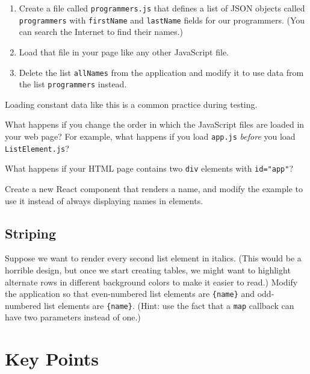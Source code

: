 
\begin{enumerate}
\item
  Create a file called \texttt{programmers.js} that defines
  a list of JSON objects called \texttt{programmers}
  with \texttt{firstName} and \texttt{lastName} fields for our programmers.
  (You can search the Internet to find their names.)
\item
  Load that file in your page like any other JavaScript file.
\item
  Delete the list \texttt{allNames} from the application
  and modify it to use data from the list \texttt{programmers} instead.
\end{enumerate}

Loading constant data like this is a common practice during testing.


What happens if you change the order in which the JavaScript files
are loaded in your web page?
For example,
what happens if you load \texttt{app.js} \emph{before} you load \texttt{ListElement.js}?


What happens if your HTML page contains two \texttt{div} elements with \texttt{id="app"}?


Create a new React component that renders a name,
and modify the example to use it instead of always displaying names in \texttt{} elements.

\subsection*{Striping}
Suppose we want to render every second list element in italics.
(This would be a horrible design,
but once we start creating tables,
we might want to highlight alternate rows in different background colors
to make it easier to read.)
Modify the application so that
even-numbered list elements are \texttt{\{name\}}
and odd-numbered list elements are \texttt{\{name\}}.
(Hint: use the fact that a \texttt{map} callback can have two parameters instead of one.)

\section*{Key Points}


